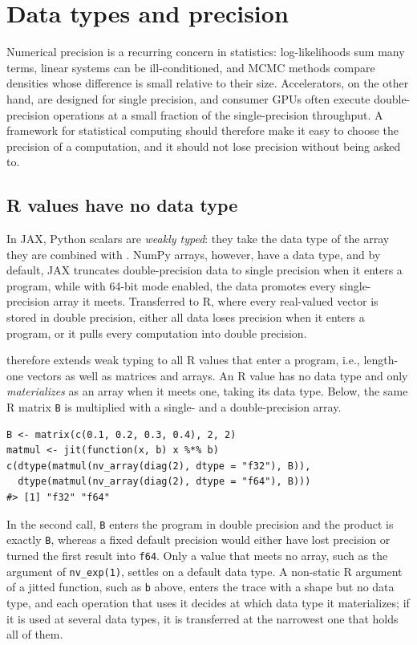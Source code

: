 \section{Data types and precision}\label{precision}

Numerical precision is a recurring concern in statistics: log-likelihoods sum many terms, linear systems can be ill-conditioned, and MCMC methods compare densities whose difference is small relative to their size.
Accelerators, on the other hand, are designed for single precision, and consumer GPUs often execute double-precision operations at a small fraction of the single-precision throughput.
A framework for statistical computing should therefore make it easy to choose the precision of a computation, and it should not lose precision without being asked to.

\subsection{R values have no data type}\label{r-values-have-no-data-type}

In JAX, Python scalars are \emph{weakly typed}: they take the data type of the array they are combined with \citep{ref-jax}.
NumPy arrays, however, have a data type, and by default, JAX truncates double-precision data to single precision when it enters a program, while with 64-bit mode enabled, the data promotes every single-precision array it meets.
Transferred to R, where every real-valued vector is stored in double precision, either all data loses precision when it enters a program, or it pulls every computation into double precision.

 therefore extends weak typing to all R values that enter a program, i.e., length-one vectors as well as matrices and arrays.
An R value has no data type and only \emph{materializes} as an array when it meets one, taking its data type.
Below, the same R matrix \texttt{B} is multiplied with a single- and a double-precision array.

\begin{verbatim}
B <- matrix(c(0.1, 0.2, 0.3, 0.4), 2, 2)
matmul <- jit(function(x, b) x %*% b)
c(dtype(matmul(nv_array(diag(2), dtype = "f32"), B)),
  dtype(matmul(nv_array(diag(2), dtype = "f64"), B)))
#> [1] "f32" "f64"
\end{verbatim}

In the second call, \texttt{B} enters the program in double precision and the product is exactly \texttt{B}, whereas a fixed default precision would either have lost precision or turned the first result into \texttt{f64}.
Only a value that meets no array, such as the argument of \texttt{nv\_exp(1)}, settles on a default data type.
A non-static R argument of a jitted function, such as \texttt{b} above, enters the trace with a shape but no data type, and each operation that uses it decides at which data type it materializes; if it is used at several data types, it is transferred at the narrowest one that holds all of them.

